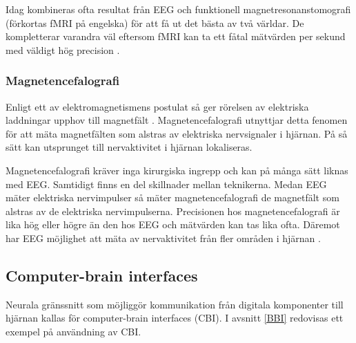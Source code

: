 \documentclass[12pt, a4paper]{article}
\begin{document}

Idag kombineras ofta resultat från EEG och funktionell magnetresonanstomografi (förkortas fMRI på engelska) för att få ut det bästa av två världar. De kompletterar varandra väl eftersom fMRI kan ta ett fåtal mätvärden per sekund med väldigt hög precision \cite{eeg_fmri}.


\subsubsection{Magnetencefalografi}
\label{meg}

Enligt ett av elektromagnetismens postulat så ger rörelsen av elektriska laddningar upphov till magnetfält \cite{electromagnetism}. Magnetencefalografi utnyttjar detta fenomen för att mäta magnetfälten som alstras av elektriska nervsignaler i hjärnan. På så sätt kan utsprunget till nervaktivitet i hjärnan lokaliseras.

Magnetencefalografi kräver inga kirurgiska ingrepp och kan på många sätt liknas med EEG. Samtidigt finns en del skillnader mellan teknikerna. Medan EEG mäter elektriska nervimpulser så mäter magnetencefalografi de magnetfält som alstras av de elektriska nervimpulserna. Precisionen hos magnetencefalografi är lika hög eller högre än den hos EEG och mätvärden kan tas lika ofta. Däremot har EEG möjlighet att mäta av nervaktivitet från fler områden i hjärnan \cite{meg_eeg}.

%
%


\subsection{Computer-brain interfaces}

Neurala gränssnitt som möjliggör kommunikation från digitala komponenter till hjärnan kallas för computer-brain interfaces (CBI). I avsnitt \ref{BBI} redovisas ett exempel på användning av CBI.
\end{document}
